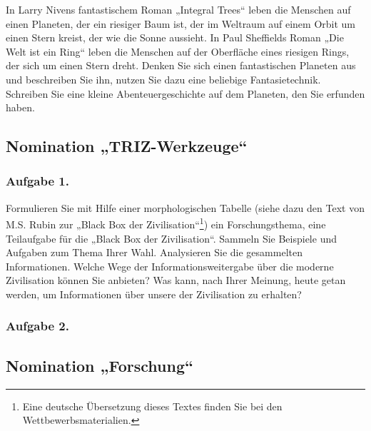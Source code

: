 \documentclass[11pt,a4paper]{article}
\begin{document}
In Larry Nivens fantastischem Roman „Integral Trees“ leben die Menschen auf
einen Planeten, der ein riesiger Baum ist, der im Weltraum auf einem Orbit um
einen Stern kreist, der wie die Sonne aussieht. In Paul Sheffields Roman „Die
Welt ist ein Ring“ leben die Menschen auf der Oberfläche eines riesigen Rings,
der sich um einen Stern dreht.  Denken Sie sich einen fantastischen Planeten
aus und beschreiben Sie ihn, nutzen Sie dazu eine beliebige
Fantasietechnik. Schreiben Sie eine kleine Abenteuergeschichte auf dem
Planeten, den Sie erfunden haben.

\subsection{Nomination „TRIZ-Werkzeuge“}

\newcommand{\BlackBox}{Formulieren Sie mit Hilfe einer morphologischen Tabelle
  (siehe dazu den Text von M.S. Rubin zur „Black Box der
  Zivilisation“\footnote{Eine deutsche Übersetzung dieses Textes finden Sie
    bei den Wettbewerbsmaterialien.}) ein Forschungsthema, eine Teilaufgabe
  für die „Black Box der Zivilisation“. Sammeln Sie Beispiele und Aufgaben zum
  Thema Ihrer Wahl. Analysieren Sie die gesammelten Informationen.  Welche
  Wege der Informationsweitergabe über die moderne Zivilisation können Sie
  anbieten?  Was kann, nach Ihrer Meinung, heute getan werden, um
  Informationen über unsere der Zivilisation zu erhalten?}

\subsubsection*{Aufgabe 1.}\BlackBox
\subsubsection*{Aufgabe 2.}\CosmicInventions

\subsection{Nomination „Forschung“}
\end{document}

